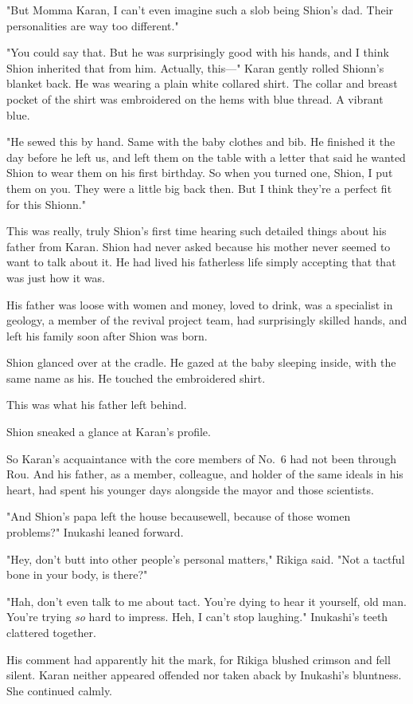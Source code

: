 "But Momma Karan, I can't even imagine such a slob being Shion's dad.
Their personalities are way too different."

"You could say that. But he was surprisingly good with his hands, and I
think Shion inherited that from him. Actually, this---" Karan gently
rolled Shionn's blanket back. He was wearing a plain white collared
shirt. The collar and breast pocket of the shirt was embroidered on the
hems with blue thread. A vibrant blue.

"He sewed this by hand. Same with the baby clothes and bib. He finished
it the day before he left us, and left them on the table with a letter
that said he wanted Shion to wear them on his first birthday. So when
you turned one, Shion, I put them on you. They were a little big back
then. But I think they're a perfect fit for this Shionn."

This was really, truly Shion's first time hearing such detailed things
about his father from Karan. Shion had never asked because his mother
never seemed to want to talk about it. He had lived his fatherless life
simply accepting that that was just how it was.

His father was loose with women and money, loved to drink, was a
specialist in geology, a member of the revival project team, had
surprisingly skilled hands, and left his family soon after Shion was
born.

Shion glanced over at the cradle. He gazed at the baby sleeping inside,
with the same name as his. He touched the embroidered shirt.

This was what his father left behind.

Shion sneaked a glance at Karan's profile.

So Karan's acquaintance with the core members of No.~6 had not been
through Rou. And his father, as a member, colleague, and holder of the
same ideals in his heart, had spent his younger days alongside the mayor
and those scientists.

"And Shion's papa left the house because\el well, because of those women
problems?" Inukashi leaned forward.

"Hey, don't butt into other people's personal matters," Rikiga said.
"Not a tactful bone in your body, is there?"

"Hah, don't even talk to me about tact. You're dying to hear it
yourself, old man. You're trying \emph{so} hard to impress. Heh, I can't stop
laughing." Inukashi's teeth clattered together.

His comment had apparently hit the mark, for Rikiga blushed crimson and
fell silent. Karan neither appeared offended nor taken aback by
Inukashi's bluntness. She continued calmly.


